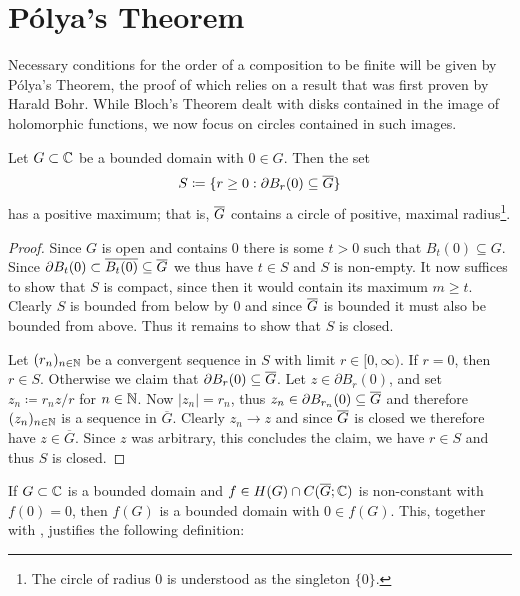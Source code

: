\section{Pólya's Theorem}
\label{sec:polyas-theorem}

Necessary conditions for the order of a composition to be finite will be given by Pólya's Theorem, the proof of which relies on a result that was first proven by Harald Bohr. While Bloch's Theorem dealt with disks contained in the image of holomorphic functions, we now focus on circles contained in such images.

\begin{proposition} \label{prop:existence-circle-maximal-radius}
    Let $G \subset \mathbb{C}$ be a bounded domain with $0 \in G$. Then the set
    \begin{equation} \label{eq:set-circle-maximal-radius}
        S \coloneqq \{ r \geq 0 : \partial B_r(0) \subseteq \overline{G} \}
    \end{equation}
    has a positive maximum; that is, $\overline{G}$ contains a circle of positive, maximal radius\footnote{The circle of radius $0$ is understood as the singleton $\{ 0 \}$.}.
\end{proposition}

\begin{proof}
    Since $G$ is open and contains $0$ there is some $t > 0$ such that $B_t(0) \subseteq G$. Since $\partial B_t(0) \subset \overline{B_t(0)} \subseteq \overline{G}$ we thus have $t \in S$ and $S$ is non-empty. It now suffices to show that $S$ is compact, since then it would contain its maximum $m \geq t$. Clearly $S$ is bounded from below by $0$ and since $\overline{G}$ is bounded it must also be bounded from above. Thus it remains to show that $S$ is closed.

    Let $(r_n)_{n \in \mathbb{N}}$ be a convergent sequence in $S$ with limit $r \in [0, \infty)$. If $r = 0$, then $r \in S$. Otherwise we claim that $\partial B_r(0) \subseteq \overline{G}$. Let $z \in \partial B_r(0)$, and set $z_n \coloneqq r_n z / r$ for $n \in \mathbb{N}$. Now $\vert z_n \vert = r_n$, thus $z_n \in \partial B_{r_n}(0) \subseteq \overline{G}$ and therefore $(z_n)_{n \in \mathbb{N}}$ is a sequence in $\overline{G}$. Clearly $z_n \to z$ and since $\overline{G}$ is closed we therefore have $z \in \overline{G}$. Since $z$ was arbitrary, this concludes the claim, we have $r \in S$ and thus $S$ is closed.
\end{proof}

If $G \subset \mathbb{C}$ is a bounded domain and $f \in H(G) \cap C(\overline{G}; \mathbb{C})$ is non-constant with $f(0) = 0$, then $f(G)$ is a bounded domain with $0 \in f(G)$. This, together with , justifies the following definition:

